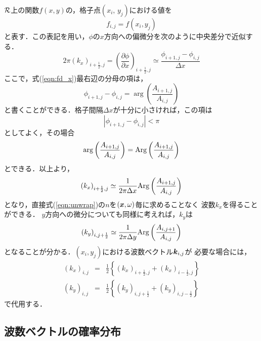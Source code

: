 $\cal R$上の関数$f(x,y)$の，格子点$(x_i,\, y_j)$における値を
\begin{equation}
	f_{i,j}=f(x_i,y_j)
	\label{eqn:}
\end{equation}
と表す．この表記を用い，$\phi$の$x$方向への偏微分を次のように中央差分で近似する．
\begin{equation}
	2\pi (k_x)_{i+\frac{1}{2},j}
	=
	\left( \frac{\partial \phi }{\partial x}\right) _{i+\frac{1}{2},j}
	\simeq 
	\frac{\phi_{i+1,j}-\phi_{i,j}}{\Delta x}
	\label{eqn:fd_x}
\end{equation}
ここで，式(\ref{eqn:fd_x})最右辺の分母の項は，
\begin{equation}
	\phi_{i+1,j}-\phi_{i,j}
	=
	\arg \left(\frac{ A_{i+1,j}}{A_{i,j}}\right)
\end{equation}
と書くことができる．格子間隔$\Delta x$が十分に小さければ，この項は
\begin{equation}
	\left| \phi_{i+1,j}-\phi_{i,j}\right| < \pi
	\label{eqn:phi_bound}
\end{equation}
としてよく，その場合
\begin{equation}
	\arg \left(\frac{ A_{i+1,j}}{A_{i,j}}\right)
	=
	{\rm Arg}\left(\frac{ A_{i+1,j}}{A_{i,j}}\right)
\end{equation}
とできる．以上より，
\begin{equation}
	\left( k_x \right)_{i+\frac{1}{2},j} 
	\simeq 
	\frac{1}{2\pi \Delta x}
	{\rm Arg} \left( \frac{ A_{i+1,j}}{A_{i,j}} \right)
	\label{eqn:kx_FD}
\end{equation}
となり，直接式(\ref{eqn:unwrap})の$n$を$(\mbox{\boldmath{$x$}},\omega)$毎に求めることなく
波数$k_x$を得ることができる．
$y$方向への微分についても同様に考えれば，$k_y$は
\begin{equation}
	\left( k_y \right)_{i,j+\frac{1}{2}} 
	\simeq 
	\frac{1}{2\pi \Delta y}
	{\rm Arg} \left( \frac{ A_{i,j+1}}{A_{i,j}} \right)
	\label{eqn:ky_FD}
\end{equation}
となることが分かる．$(x_i,y_j)$における波数ベクトル$\mbox{\boldmath{$k$}}_{i,j}$が
必要な場合には，
\begin{eqnarray}
	(k_x)_{i,j} &=&
	\frac{1}{2}\left\{ (k_x)_{i+\frac{1}{2},j}+ (k_x)_{i-\frac{1}{2},j} \right\}
	\label{eqn:} \\
	(k_y)_{i,j} &=&
	\frac{1}{2}\left\{ (k_y)_{i,j+\frac{1}{2}}+ (k_y)_{i,j-\frac{1}{2}} \right\}
	\label{eqn:}
\end{eqnarray}
で代用する．
\subsection{波数ベクトルの確率分布}
